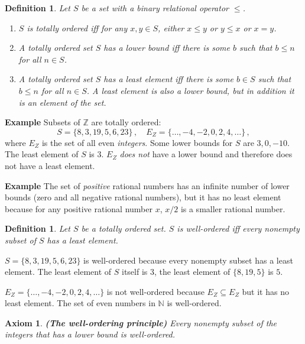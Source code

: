 \documentclass[12pt,a4paper]{article}
\newtheorem{definition}[theorem]{Definition}
\newtheorem{axiom}[theorem]{Axiom}
\newenvironment{example}{\textbf{Example}}{}
\begin{document}
\begin{definition} Let $S$ be a set with a binary relational operator $\leq$.
\begin{enumerate}
\item $S$ is \emph{totally ordered} iff for any $x,y\in S$, either $x\leq y$ or $y \leq x$ or $x=y$.
\item A totally ordered set $S$ has a \emph{lower bound} iff there is some $b$ such that $b\leq n$ for all $n\in S$.
\item A totally ordered set $S$ has a \emph{least element} iff there is some $b\in S$ such that $b\leq n$ for all $n\in S$. A least element is also a lower bound, but in addition it is an element of the set.
\end{enumerate}
\end{definition}
\begin{example}
Subsets of $\mathbb{Z}$ are totally ordered:
\[
S=\{8,3,19,5,6,23\}\,,\quad E_Z=\{\ldots,-4,-2,0,2,4,\ldots\}\,,
\]
where $E_Z$ is the set of all even \emph{integers}. Some lower bounds for $S$ are $3, 0, -10$. The least element of $S$ is $3$. $E_Z$ \emph{does not} have a lower bound and therefore does not have a least element.
\end{example}

\begin{example}
The set of \emph{positive} rational numbers has an infinite number of lower bounds (zero and all negative rational numbers), but it has no least element because for any positive rational number $x$, $x/2$ is a smaller rational number.
\end{example}
\begin{definition} Let $S$ be a totally ordered set. $S$ is \emph{well-ordered} iff \emph{every} nonempty subset of $S$ has a least element.
\end{definition}

$S=\{8,3,19,5,6,23\}$ is well-ordered because every nonempty subset has a least element. The least element of $S$ itself is $3$, the least element of $\{8, 19, 5\}$ is $5$.

$E_Z=\{\ldots,-4,-2,0,2,4,\ldots\}$ is not well-ordered because $E_Z\subseteq E_Z$ but it has no least element. The set of even numbers in $\mathbb{N}$ is well-ordered.

\begin{axiom}\label{ax.wop} \textbf{(The well-ordering principle)} Every nonempty subset of the integers that has a lower bound is well-ordered.
\end{axiom}
\end{document}
